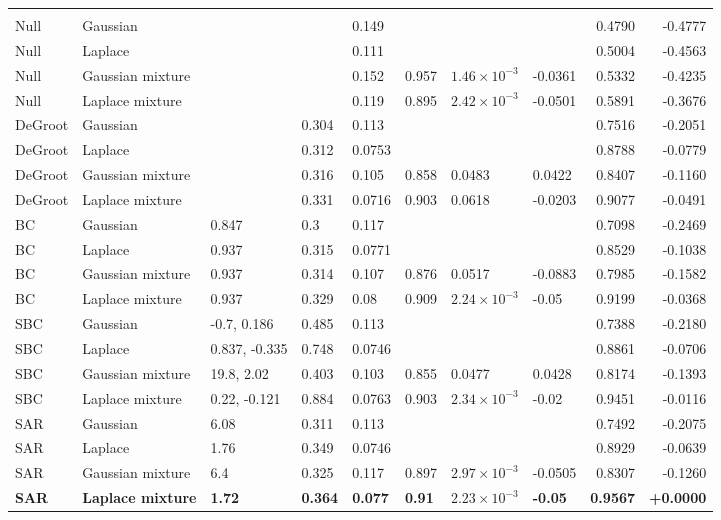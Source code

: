 \begin{longtable}{llllllllrr}
\midrule
\multicolumn{10}{l}{\takacsDis{}} \\
Null & Gaussian &  &  & 0.149 &  &  &  & 0.4790 & -0.4777 \\
Null & Laplace &  &  & 0.111 &  &  &  & 0.5004 & -0.4563 \\
Null & Gaussian mixture &  &  & 0.152 & 0.957 & $1.46\times10^{-3}$ & -0.0361 & 0.5332 & -0.4235 \\
Null & Laplace mixture &  &  & 0.119 & 0.895 & $2.42\times10^{-3}$ & -0.0501 & 0.5891 & -0.3676 \\
DeGroot & Gaussian &  & 0.304 & 0.113 &  &  &  & 0.7516 & -0.2051 \\
DeGroot & Laplace &  & 0.312 & 0.0753 &  &  &  & 0.8788 & -0.0779 \\
DeGroot & Gaussian mixture &  & 0.316 & 0.105 & 0.858 & 0.0483 & 0.0422 & 0.8407 & -0.1160 \\
DeGroot & Laplace mixture &  & 0.331 & 0.0716 & 0.903 & 0.0618 & -0.0203 & 0.9077 & -0.0491 \\
BC & Gaussian & 0.847 & 0.3 & 0.117 &  &  &  & 0.7098 & -0.2469 \\
BC & Laplace & 0.937 & 0.315 & 0.0771 &  &  &  & 0.8529 & -0.1038 \\
BC & Gaussian mixture & 0.937 & 0.314 & 0.107 & 0.876 & 0.0517 & -0.0883 & 0.7985 & -0.1582 \\
BC & Laplace mixture & 0.937 & 0.329 & 0.08 & 0.909 & $2.24\times10^{-3}$ & -0.05 & 0.9199 & -0.0368 \\
SBC & Gaussian & -0.7, 0.186 & 0.485 & 0.113 &  &  &  & 0.7388 & -0.2180 \\
SBC & Laplace & 0.837, -0.335 & 0.748 & 0.0746 &  &  &  & 0.8861 & -0.0706 \\
SBC & Gaussian mixture & 19.8, 2.02 & 0.403 & 0.103 & 0.855 & 0.0477 & 0.0428 & 0.8174 & -0.1393 \\
SBC & Laplace mixture & 0.22, -0.121 & 0.884 & 0.0763 & 0.903 & $2.34\times10^{-3}$ & -0.02 & 0.9451 & -0.0116 \\
SAR & Gaussian & 6.08 & 0.311 & 0.113 &  &  &  & 0.7492 & -0.2075 \\
SAR & Laplace & 1.76 & 0.349 & 0.0746 &  &  &  & 0.8929 & -0.0639 \\
SAR & Gaussian mixture & 6.4 & 0.325 & 0.117 & 0.897 & $2.97\times10^{-3}$ & -0.0505 & 0.8307 & -0.1260 \\
\textbf{SAR} & \textbf{Laplace mixture} & \textbf{1.72} & \textbf{0.364} & \textbf{0.077} & \textbf{0.91} & \textbf{$2.23\times10^{-3}$} & \textbf{-0.05} & \textbf{0.9567} & \textbf{+0.0000} \\

\end{longtable}
